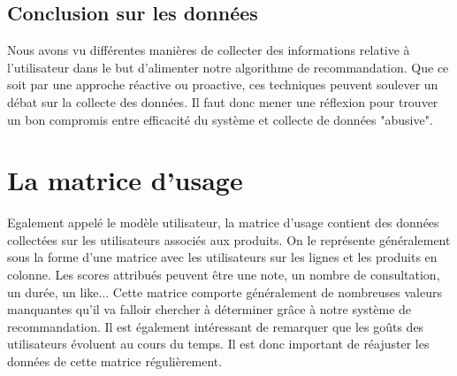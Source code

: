 \documentclass{report}
\begin{document}
\subsection{Conclusion sur les données}
Nous avons vu différentes manières de collecter des informations relative à l'utilisateur dans le but d'alimenter notre algorithme de recommandation. Que ce soit par une approche réactive ou proactive, ces techniques peuvent soulever un débat sur la collecte des données. Il faut donc mener une réflexion pour trouver un bon compromis entre efficacité du système et collecte de données "abusive".

\section{La matrice d'usage}
Egalement appelé le modèle utilisateur, la matrice d'usage contient des données collectées sur les utilisateurs associés aux produits. On le représente généralement sous la forme d'une matrice avec les utilisateurs sur les lignes et les produits en colonne. Les scores attribués peuvent être une note, un nombre de consultation, un durée, un like... Cette matrice comporte généralement de nombreuses valeurs manquantes qu'il va falloir chercher à déterminer grâce à notre système de recommandation.  Il est également intéressant de remarquer que les goûts des utilisateurs évoluent au cours du temps. Il est donc important de réajuster les données de cette matrice régulièrement.
\end{document}

